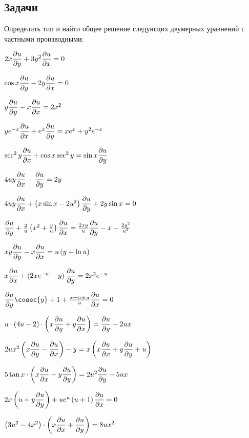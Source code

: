 \subsection{Задачи}

	Определить тип и найти общее решение следующих двумерных уравнений с частными производными:

	\begin{multicols}{2}
		\begin{enumtasks}

			\label{nonlinsys_quazilinear:dim2}
			\item \( 2x \dfrac{\partial u}{\partial y} + 3 y^2 \dfrac{\partial u}{\partial x} = 0 \)														%
			\item \( \cos{x} \dfrac{\partial u}{\partial y} - 2y \dfrac{\partial u}{\partial x} = 0 \)														%
			\item \( y \dfrac{\partial u}{\partial y} - x \dfrac{\partial u}{\partial x} = 2 x^2 \)															%
			\item \( y e^{-x} \dfrac{\partial u}{\partial x} + e^x \dfrac{\partial u}{\partial y} = xe^x + y^2 e^{-x} \)									%
			\item \( \sec^2{y} \dfrac{\partial u}{\partial x} + \cos{x}\sec^2{y} = \sin{x} \dfrac{\partial u}{\partial y} \)								%
			\item \( 4uy \dfrac{\partial u}{\partial x} - \dfrac{\partial u}{\partial y} = 2y \)															%
			\item \( 4uy \dfrac{\partial u}{\partial x} + \left( x \sin{x} - 2u^2 \right) \dfrac{\partial u}{\partial y} + 2y \sin{x} = 0 \)						%
			\item \( \dfrac{\partial u}{\partial y} + \frac{2}{u}\left( x^2 + \frac{y}{u} \right) \dfrac{\partial u}{\partial x} = \frac{2xy}{u} \dfrac{\partial u}{\partial y} - x - \frac{2y^2}{u^2} \)			%
			
			\label{nonlinsys_quazilinear:dim2_part2}
			\item \( x y \dfrac{\partial u}{\partial y} - x \dfrac{\partial u}{\partial x} = u \left( y + \ln{u} \right) \)										%
			\item \( x \dfrac{\partial u}{\partial x} + \left( 2 x e^{-u} - y \right) \dfrac{\partial u}{\partial y} = 2x^2 e^{-u} \)								%
			\item \( \dpart{u}{y} \cosec{y} + 1 + \frac{x + \cos{u}}{u} \dpart{u}{x} = 0 \)								%
			\item \( u \cdot \left( 4u - 2 \right) \cdot \left( x \dfrac{\partial u}{\partial y} + y \dfrac{\partial u}{\partial x} \right) = \dfrac{\partial u}{\partial y} - 2ux \)		%
			\item \( 2ux^2 \left( x \dfrac{\partial u}{\partial y} - \dfrac{\partial u}{\partial x} \right) - y = x \left( x \dfrac{\partial u}{\partial x} + y \dfrac{\partial u}{\partial y} + u \right) \) 					%
			\item \( 5 \tan{x} \cdot \left( x \dfrac{\partial u}{\partial x} - y \dfrac{\partial u}{\partial y} \right) = 2u^2 \dfrac{\partial u}{\partial y} - 5ux \)				%
			\item \( 2x \left( u + y\dfrac{\partial u}{\partial y} \right) + ue^{u} \left( u + 1 \right) \dfrac{\partial u}{\partial x} = 0 \)							%
			\item \( \left( 3u^2 - 4x^2 \right) \cdot \left( x \dfrac{\partial u}{\partial x} + \dfrac{\partial u}{\partial y} \right) = 8ux^2 \)							%

		\end{enumtasks}
	\end{multicols}

